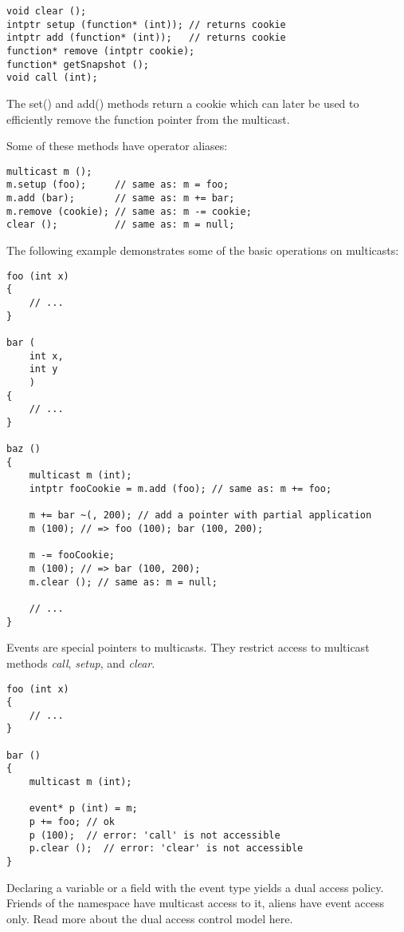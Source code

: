 \documentclass[oneside]{book}
\begin{document}
\begin{lstlisting}
void clear ();
intptr setup (function* (int)); // returns cookie
intptr add (function* (int));   // returns cookie
function* remove (intptr cookie);
function* getSnapshot ();
void call (int);
\end{lstlisting}

The set() and add() methods return a cookie which can later be used to efficiently remove the function pointer from the multicast.

Some of these methods have operator aliases:

\begin{lstlisting}
multicast m ();
m.setup (foo);     // same as: m = foo;
m.add (bar);       // same as: m += bar;
m.remove (cookie); // same as: m -= cookie;
clear ();          // same as: m = null;
\end{lstlisting}

The following example demonstrates some of the basic operations on multicasts:

\begin{lstlisting}
foo (int x)
{
    // ...
}

bar (
    int x, 
    int y   
    )
{
    // ...
}

baz ()
{
    multicast m (int);
    intptr fooCookie = m.add (foo); // same as: m += foo;

    m += bar ~(, 200); // add a pointer with partial application
    m (100); // => foo (100); bar (100, 200);

    m -= fooCookie;
    m (100); // => bar (100, 200);
    m.clear (); // same as: m = null;

    // ...
}
\end{lstlisting}

Events are special pointers to multicasts. They restrict access to multicast methods \emph{call}, \emph{setup}, and \emph{clear}.

\begin{lstlisting}
foo (int x)
{
    // ...
}

bar ()
{
    multicast m (int);

    event* p (int) = m;
    p += foo; // ok
    p (100);  // error: 'call' is not accessible
    p.clear ();  // error: 'clear' is not accessible
}
\end{lstlisting}

Declaring a variable or a field with the event type yields a dual access policy. Friends of the namespace have multicast access to it, aliens have event access only. Read more about the dual access control model here.
\end{document}
